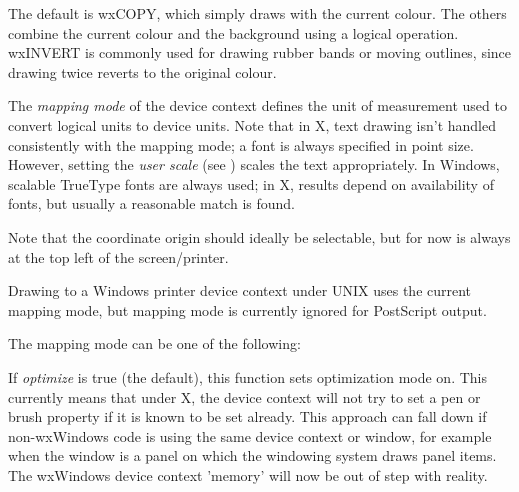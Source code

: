 The default is wxCOPY, which simply draws with the current colour.
The others combine the current colour and the background using a
logical operation.  wxINVERT is commonly used for drawing rubber bands or
moving outlines, since drawing twice reverts to the original colour.


\label{wxdcsetmapmode}


The {\it mapping mode} of the device context defines the unit of
measurement used to convert logical units to device units. Note that
in X, text drawing isn't handled consistently with the mapping mode; a
font is always specified in point size. However, setting the {\it
user scale} (see ) scales the text appropriately. In
Windows, scalable TrueType fonts are always used; in X, results depend
on availability of fonts, but usually a reasonable match is found.

Note that the coordinate origin should ideally be selectable, but for
now is always at the top left of the screen/printer.

Drawing to a Windows printer device context under UNIX
uses the current mapping mode, but mapping mode is currently ignored for
PostScript output.

The mapping mode can be one of the following:

\begin{twocollist}\itemsep=0pt
\end{twocollist}


\label{wxsetoptimization}


If {\it optimize} is true (the default), this function sets optimization mode on.
This currently means that under X, the device context will not try to set a pen or brush
property if it is known to be set already. This approach can fall down
if non-wxWindows code is using the same device context or window, for example
when the window is a panel on which the windowing system draws panel items.
The wxWindows device context 'memory' will now be out of step with reality.

